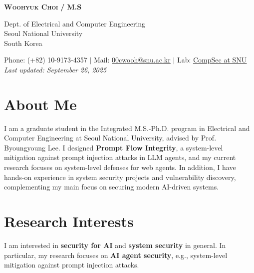 \documentclass[letterpaper,11pt]{article}
\begin{document}


\begin{center}
  \textbf{\Huge \scshape Woohyuk Choi} \textbf{ /  M.S} \\ \vspace{10pt}

  Dept. of Electrical and Computer Engineering \\
  Seoul National University \\
  South Korea \\ \vspace{10pt}

  \small Phone: (+82) 10-9173-4357 $|$ Mail:
  \href{mailto:00cwooh@snu.ac.kr}{\underline{00cwooh@snu.ac.kr}} $|$
  Lab: \href{https://compsec.snu.ac.kr}{\underline{CompSec at SNU}} \\
  \vspace{5pt}
  \textit{\small Last updated: September 26, 2025}
\end{center}

\vspace{15pt}
\section{About Me} 
I am a graduate student in the Integrated M.S.-Ph.D. program in Electrical
and Computer Engineering at Seoul National University, advised by Prof.
Byoungyoung Lee.
%
I designed \textbf{Prompt Flow Integrity}, a system-level
mitigation against prompt injection attacks in LLM agents,
and my current research focuses on system-level defenses for
web agents. 
%
In addition, I have hands-on experience in system security projects and
vulnerability discovery, complementing my main focus on securing
modern AI-driven systems.

\vspace{10pt}

\section{Research Interests}

I am interested in \textbf{security for AI} and \textbf{system security}
in general.
%
In particular, my research focuses on \textbf{AI agent security}, e.g., 
system-level mitigation against prompt injection attacks.

\vspace{10pt}
\end{document}
